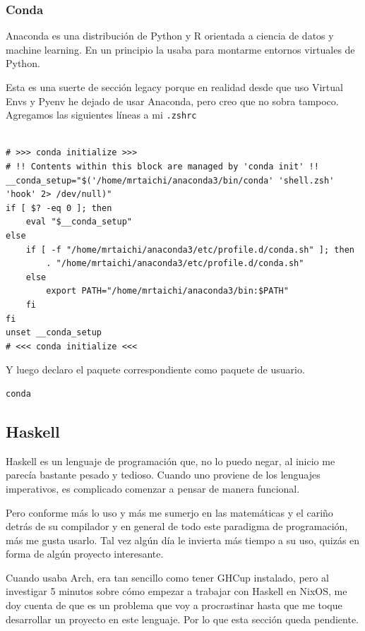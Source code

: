 \documentclass[11pt]{article}
\begin{document}
\subsubsection{Conda}
\label{sec:org35b4e01}

Anaconda es una distribución de Python y R orientada a ciencia de datos y machine learning. En un principio la usaba para montarme entornos virtuales de Python.

Esta es una suerte de sección legacy porque en realidad desde que uso Virtual Envs y Pyenv he dejado de usar Anaconda, pero creo que no sobra tampoco. Agregamos las siguientes líneas a mi \texttt{.zshrc}

\begin{verbatim}

# >>> conda initialize >>>
# !! Contents within this block are managed by 'conda init' !!
__conda_setup="$('/home/mrtaichi/anaconda3/bin/conda' 'shell.zsh' 'hook' 2> /dev/null)"
if [ $? -eq 0 ]; then
    eval "$__conda_setup"
else
    if [ -f "/home/mrtaichi/anaconda3/etc/profile.d/conda.sh" ]; then
        . "/home/mrtaichi/anaconda3/etc/profile.d/conda.sh"
    else
        export PATH="/home/mrtaichi/anaconda3/bin:$PATH"
    fi
fi
unset __conda_setup
# <<< conda initialize <<<

\end{verbatim}

Y luego declaro el paquete correspondiente como paquete de usuario.

\begin{verbatim}
conda
\end{verbatim}
\subsection{Haskell}
\label{sec:org56328b8}

Haskell es un lenguaje de programación que, no lo puedo negar, al inicio me parecía bastante pesado y tedioso. Cuando uno proviene de los lenguajes imperativos, es complicado comenzar a pensar de manera funcional.

Pero conforme más lo uso y más me sumerjo en las matemáticas y el cariño detrás de su compilador y en general de todo este paradigma de programación, más me gusta usarlo. Tal vez algún día le invierta más tiempo a su uso, quizás en forma de algún proyecto interesante.

Cuando usaba Arch, era tan sencillo como tener GHCup instalado, pero al investigar 5 minutos sobre cómo empezar a trabajar con Haskell en NixOS, me doy cuenta de que es un problema que voy a procrastinar hasta que me toque desarrollar un proyecto en este lenguaje. Por lo que esta sección queda pendiente.
\end{document}
